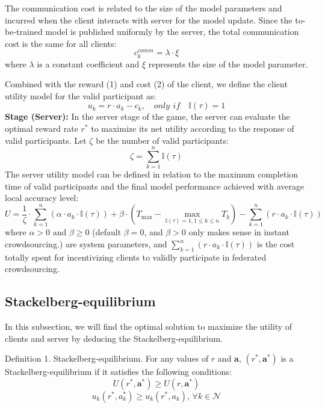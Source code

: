 \documentclass[final,1p,times]{elsarticle}
\begin{document}
The communication cost is related to the size of the model parameters and incurred when the client interacts with server for the model update. Since the to-be-trained model is published uniformly by the server, the total communication cost is the same for all clients:
\begin{equation}
	c_k^{comm} = \lambda\cdot\xi
\end{equation}
where $\lambda$ is a constant coefficient and $\xi$ represents the size of the model parameter.

Combined with the reward (1) and cost (2) of the client, we define the client utility model for the valid participant as:
\begin{equation}
	u_k = r\cdot a_k - c_k, \quad only\,\: if\quad\mathbb{I}(\tau) = 1
\end{equation}
\textbf{Stage \uppercase\expandafter{} (Server):} In the server stage of the game, the server can evaluate the optimal reward rate $r^\ast$ to maximize its net utility according to the response of valid participants. Let $\zeta$ be the number of valid participants:
\begin{equation}
	\zeta = \sum_{k=1}^n\mathbb{I}(\tau)
\end{equation}
The server utility model can be defined in relation to the maximum completion time of valid participants and the final model performance achieved with average local accuracy level:
\begin{equation}
	U = \frac{1}{\zeta}\cdot \sum_{k=1}^n(\alpha\cdot a_k\cdot \mathbb{I}(\tau)) + \beta\cdot(T_{\max}-\max_{\mathbb{I}(\tau)=1,1\le k\le n}T_k) - \sum_{k=1}^n(r\cdot a_k\cdot \mathbb{I}(\tau))
\end{equation}
where $\alpha > 0$ and $\beta \ge 0$ (default $\beta = 0$, and $\beta > 0$ only makes sense in instant crowdsourcing.) are system parameters, and $\sum_{k=1}^n(r\cdot a_k\cdot \mathbb{I}(\tau))$ is the cost totally spent for incentivizing clients to validly participate in federated crowdsourcing.
\subsection{Stackelberg-equilibrium}
In this subsection, we will find the optimal solution to maximize the utility of clients and server by deducing the Stackelberg-equilibrium. 

Definition 1. Stackelberg-equilibrium. For any values of $r$ and $\bm{a}$, $(r^\ast,\bm{a}^\ast)$ is a Stackelberg-equilibrium if  it satisfies the following conditions:
\begin{equation}
	U(r^\ast,\bm{a}^\ast) \ge U(r,\bm{a}^\ast)
\end{equation}	
\begin{equation}
	u_k(r^\ast,a_k^\ast) \ge u_k(r^\ast,a_k),\, \forall k \in \bm{\mathcal{N}}
\end{equation}	
\end{document}
